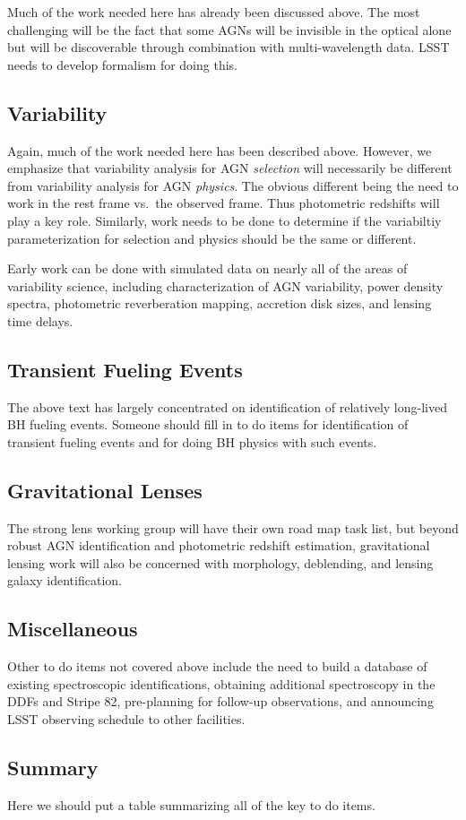Much of the work needed here has already been discussed above.  The most challenging will be the fact that some AGNs will be invisible in the optical alone but will be discoverable through combination with multi-wavelength data.  LSST needs to develop formalism for doing this.

\subsection{Variability}

Again, much of the work needed here has been described above.  However, we emphasize that variability analysis for AGN {\em selection} will necessarily be different from variability analysis for AGN {\em physics}.  The obvious different being the need to work in the rest frame vs.\ the observed frame.  Thus photometric redshifts will play a key role.  Similarly, work needs to be done to determine if the variabiltiy parameterization for selection and physics should be the same or different.

Early work can be done with simulated data on nearly all of the areas of variability science, including characterization of AGN variability, power density spectra, photometric reverberation mapping, accretion disk sizes, and lensing time delays.

\subsection{Transient Fueling Events}

The above text has largely concentrated on identification of relatively long-lived BH fueling events.  Someone should fill in to do items for identification of transient fueling events and for doing BH physics with such events.

\subsection{Gravitational Lenses}

The strong lens working group will have their own road map task list, but beyond robust AGN identification and photometric redshift estimation, gravitational lensing work will also be concerned with morphology, deblending, and lensing galaxy identification.


\subsection{Miscellaneous}

Other to do items not covered above include the need to build a database of existing spectroscopic identifications, obtaining additional spectroscopy in the DDFs and Stripe 82, pre-planning for follow-up observations, and  announcing LSST observing schedule to other facilities.

\subsection{Summary}

Here we should put a table summarizing all of the key to do items.





